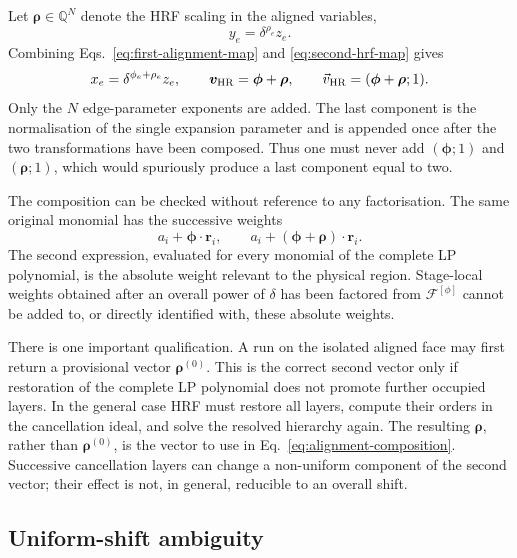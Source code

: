 \documentclass[a4paper,11pt]{article}
\newcommand{\HR}{\mathrm{HR}}
\newcommand{\vHR}{\vec v_{\rm HR}}
\begin{document}
Let \(\boldsymbol\rho\in\mathbb Q^N\) denote the HRF scaling in the aligned
variables,
\begin{equation}
 y_e=\delta^{\rho_e}z_e.
 \label{eq:second-hrf-map}
\end{equation}
Combining Eqs.~\eqref{eq:first-alignment-map} and
\eqref{eq:second-hrf-map} gives
\begin{equation}
 x_e=\delta^{\phi_e+\rho_e}z_e,
 \qquad
 \boldsymbol v_{\HR}=\boldsymbol\phi+\boldsymbol\rho,
 \qquad
 \vHR=(\boldsymbol\phi+\boldsymbol\rho;1).
 \label{eq:alignment-composition}
\end{equation}
Only the \(N\) edge-parameter exponents are added.  The last component is the
normalisation of the single expansion parameter and is appended once after
the two transformations have been composed.  Thus one must never add
\((\boldsymbol\phi;1)\) and \((\boldsymbol\rho;1)\), which would spuriously
produce a last component equal to two.

The composition can be checked without reference to any factorisation.  The
same original monomial has the successive weights
\begin{equation}
 a_i+\boldsymbol\phi\cdot\boldsymbol r_i,
 \qquad
 a_i+(\boldsymbol\phi+\boldsymbol\rho)\cdot\boldsymbol r_i.
 \label{eq:successive-monomial-weights}
\end{equation}
The second expression, evaluated for every monomial of the complete LP
polynomial, is the absolute weight relevant to the physical region.
Stage-local weights obtained after an overall power of \(\delta\) has been
factored from \(\mathcal F^{[\phi]}\) cannot be added to, or directly
identified with, these absolute weights.

There is one important qualification.  A run on the isolated aligned face
may first return a provisional vector \(\boldsymbol\rho^{(0)}\).  This is the
correct second vector only if restoration of the complete LP polynomial does
not promote further occupied layers.  In the general case HRF must restore
all layers, compute their orders in the cancellation ideal, and solve the
resolved hierarchy again.  The resulting \(\boldsymbol\rho\), rather than
\(\boldsymbol\rho^{(0)}\), is the vector to use in
Eq.~\eqref{eq:alignment-composition}.  Successive cancellation layers can
change a non-uniform component of the second vector; their effect is not, in
general, reducible to an overall shift.

\subsection{Uniform-shift ambiguity}
\end{document}

